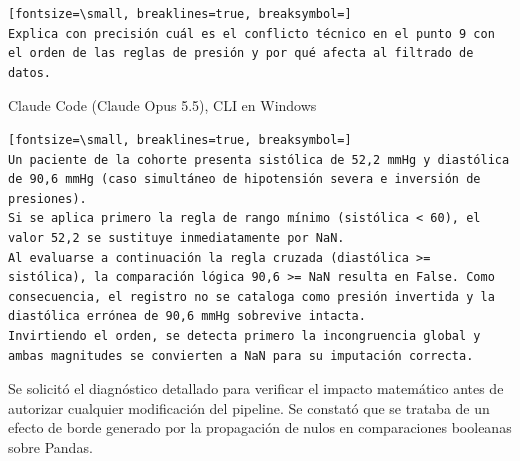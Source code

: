 \documentclass[12pt,a4paper,oneside]{book}
\begin{document}
\begin{iaprompt}
\begin{Verbatim}[fontsize=\small, breaklines=true, breaksymbol=]
Explica con precisión cuál es el conflicto técnico en el punto 9 con el orden de las reglas de presión y por qué afecta al filtrado de datos.
\end{Verbatim}
\end{iaprompt}
\begin{iaresp}{Claude Code (Claude Opus 5.5), CLI en Windows}
\begin{Verbatim}[fontsize=\small, breaklines=true, breaksymbol=]
Un paciente de la cohorte presenta sistólica de 52,2 mmHg y diastólica de 90,6 mmHg (caso simultáneo de hipotensión severa e inversión de presiones).
Si se aplica primero la regla de rango mínimo (sistólica < 60), el valor 52,2 se sustituye inmediatamente por NaN.
Al evaluarse a continuación la regla cruzada (diastólica >= sistólica), la comparación lógica 90,6 >= NaN resulta en False. Como consecuencia, el registro no se cataloga como presión invertida y la diastólica errónea de 90,6 mmHg sobrevive intacta.
Invirtiendo el orden, se detecta primero la incongruencia global y ambas magnitudes se convierten a NaN para su imputación correcta.
\end{Verbatim}
\end{iaresp}
\begin{iaanalisis}
Se solicitó el diagnóstico detallado para verificar el impacto matemático antes de autorizar cualquier modificación del pipeline. Se constató que se trataba de un efecto de borde generado por la propagación de nulos en comparaciones booleanas sobre Pandas.
\end{iaanalisis}
\end{document}
